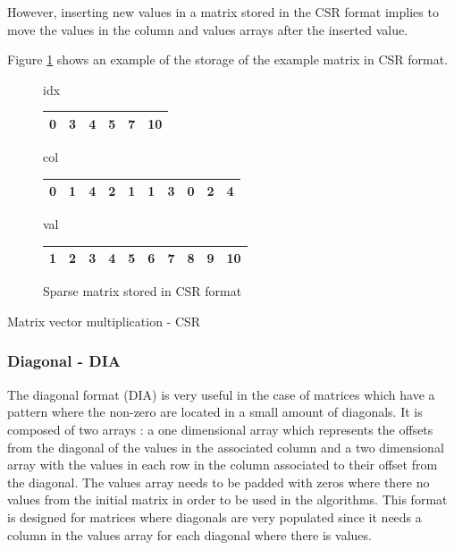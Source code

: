 However, inserting new values in a matrix stored in the CSR format implies to move the values in the column and values arrays after the inserted value.

Figure \ref{fig:methods:csr_ex} shows an example of the storage of the example matrix in CSR format.

\begin{figure}
\centering
idx
\bigskip
\begin{tabular}{|cccccc|}
\hline
0 & 3 & 4 & 5 & 7 & 10 \\
\hline
\end{tabular}

col
\bigskip
\begin{tabular}{|cccccccccc|}
\hline
0 & 1 & 4 & 2 & 1 & 1 & 3 & 0 & 2 & 4 \\
\hline
\end{tabular}

val
\bigskip
\begin{tabular}{|cccccccccc|}
\hline
1 & 2 & 3 & 4 & 5 & 6 & 7 & 8 & 9 & 10 \\
\hline
\end{tabular}
\caption{Sparse matrix stored in CSR format \label{fig:methods:csr_ex}}
\end{figure}


\begin{algorithm}[h]
	\DontPrintSemicolon
	\caption{Matrix vector multiplication - CSR\label{fig:methods:csr_algo}}
\end{algorithm}


\subsubsection{Diagonal - DIA}
The diagonal format (DIA) is very useful in the case of matrices which have a pattern where the non-zero are located in a small amount of diagonals.
It is composed of two arrays : a one dimensional array which represents the offsets from the diagonal of the values in the associated column and a two dimensional array with the values in each row in the column associated to their offset from the diagonal.
The values array needs to be padded with zeros where there no values from the initial matrix in order to be used in the algorithms.
This format is designed for matrices where diagonals are very populated since it needs a column in the values array for each diagonal where there is values.

